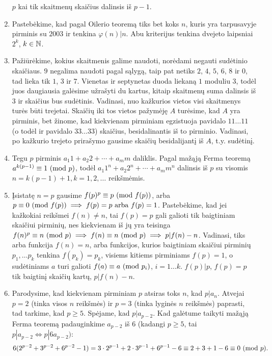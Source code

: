 \begin{enumerate}
    $p$ kai tik skaitmenų skaičius dalinsis iš $p-1$.
\item
    Pastebėkime, kad pagal Oilerio teoremą tiks bet koks $n$, kuris yra
    tarpusavyje pirminis su $2003$ ir tenkina $\varphi(n)|n$. Abu
    kriterijus tenkina dvejeto laipsniai $2^k$, $k\in \mathbb N$.
\item
    Pažiūrėkime, kokius skaitmenis galime naudoti, norėdami negauti
    sudėtinio skaičiaus. $9$ negalima naudoti pagal sąlygą, taip pat
    netiks $2$, $4$, $5$, $6$, $8$ ir $0$, tad lieka tik $1$, $3$ ir $7$.
    Vienetas ir septynetas duoda liekaną $1$ moduliu $3$, todėl juos
    daugiausia galėsime užrašyti du kartus, kitaip skaitmenų suma dalinsis
    iš $3$ ir skaičius bus sudėtinis. Vadinasi, nuo kažkurios vietos visi
    skaitmenys turės būti trejetai. Skaičių iki tos vietos pažymėję $A$
    turėsime, kad $A$ yra pirminis, bet žinome, kad kiekvienam pirminiam
    egzistuoja pavidalo $11\dots11$ (o todėl ir pavidalo $33\dots33$)
    skaičius, besidalinantis iš to pirminio. Vadinasi, po kažkurio trejeto
    prirašymo gausime skaičių besidalijantį iš $A$, t.y. sudėtinį.
\item
    Tegu $p$ pirminis $a_1 1 + a_2 2 + \cdots + a_m m$ daliklis.  Pagal
    mažąją Ferma teoremą $a^{k(p-1)}  \equiv 1 \ (\text{mod } p)$, todėl $a_1 1^n + a_2
    2^n + \cdots + a_m m^n$ dalinsis iš $p$ su visomis $n = k(p-1) + 1,
    k=1,2, \dots$ reikšmėmis.  
\item
    Įsistatę $n=p$ gausime $f(p)^p\equiv p \ (\text{mod } f(p))$, arba $p\equiv 0
    \ (\text{mod } f(p)) \implies f(p) = p \text{ arba } f(p) = 1$. Pastebėkime, kad
    jei kažkokiai reikšmei $f(n) \neq n$, tai $f(p) = p$ gali galioti tik
    baigtiniam skaičiui pirminių, nes kiekvienam iš jų yra teisinga
    $f(n)^p \equiv n \ (\text{mod } p) \implies f(n)\equiv n \ (\text{mod } p) \implies p|f(n) -
    n$. Vadinasi, tiks arba funkcija $f(n) = n$, arba funkcijos, kurios
    baigtiniam skaičiui pirminių $p_1, \ldots p_k$ tenkina $f(p_k) = p_k$,
    visiems kitiems pirminiams $f(p)=1$, o sudėtiniams $a$ turi galioti
    $f(a) \equiv a \ (\text{mod } p_i)$, $i=1\ldots k$.
    $f(p)|p$, $f(p)=p$ tik baigtinį skaičių kartų, $p|f(n) - n$. 
\item
    Parodysime, kad kiekvienam pirminiam $p$ atsiras toks $n$, kad
    $p|a_n$. Atvejai $p=2$ (tinka visos $n$ reikšmės) ir $p=3$ (tinka
    lyginės $n$ reikšmės) paprasti, tad tarkime, kad $p\geq 5$. Spėjame,
    kad $p|a_{p-2}$. Kad galėtume taikyti mažąją Ferma teoremą
    padauginkime $a_{p-2}$ iš $6$ (kadangi $p\geq 5$, tai $p|a_{p-2} \iff
    p|6a_{p-2})$: $$6(2^{p-2} + 3^{p-2} + 6^{p-2} - 1) = 3\cdot 2^{p-1} +
    2\cdot 3^{p-1} + 6^{p-1} - 6 \equiv 2 + 3 + 1 - 6 \equiv 0 \ (\text{mod } p).$$
\end{enumerate} 
